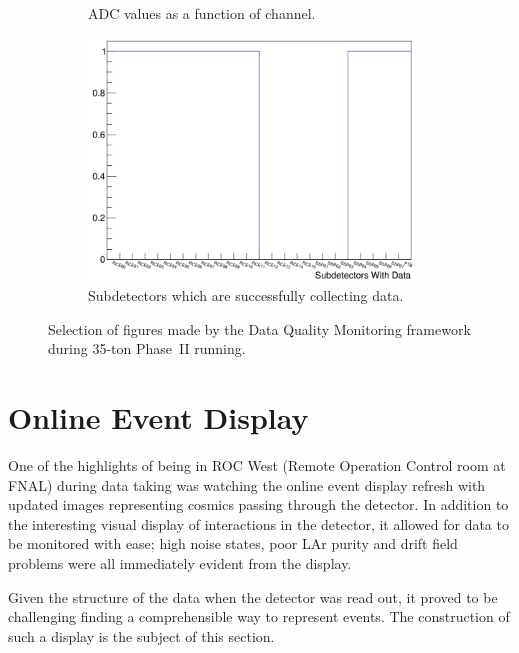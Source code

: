 \begin{figure}
\begin{subfigure}[t]{0.48\linewidth}
    \caption{ADC values as a function of channel.}
    \label{fig:DQMPlot3}
  \end{subfigure}
  \begin{subfigure}[t]{0.48\linewidth}
    \centering
    \includegraphics[width=0.95\textwidth]{DQM4.png}
    \caption{Subdetectors which are successfully collecting data.}
    \label{fig:DQMPlot4}
  \end{subfigure}
  \caption[Selection of figures made by the Data Quality Monitoring framework during 35-ton Phase~II running.]{Selection of figures made by the Data Quality Monitoring framework during 35-ton Phase~II running.}
  \label{fig:DQMPlots}
\end{figure}

\section{Online Event Display}\label{sec:EventDisplay}

One of the highlights of being in ROC West (Remote Operation Control room at FNAL) during data taking was watching the online event display refresh with updated images representing cosmics passing through the detector.  In addition to the interesting visual display of interactions in the detector, it allowed for data to be monitored with ease; high noise states, poor LAr purity and drift field problems were all immediately evident from the display.

Given the structure of the data when the detector was read out, it proved to be challenging finding a comprehensible way to represent events.  The construction of such a display is the subject of this section.

